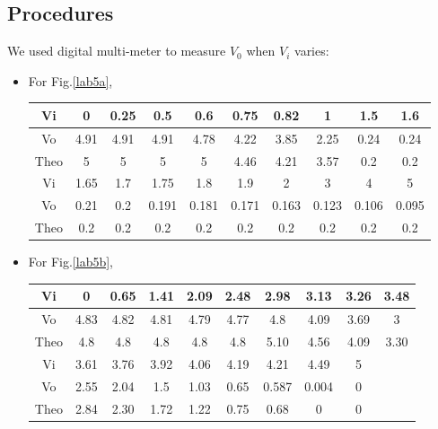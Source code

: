     \subsection{Procedures}
    We used digital multi-meter to measure $V_0$ when $V_i$ varies:\par
    \begin{itemize}
        \item For Fig.\ref{lab5a},\par
            \begin{table}[h]
            \centering
                \begin{tabular}{|c|c|c|c|c|c|c|c|c|c|}
                \hline
                Vi   & 0    & 0.25 & 0.5   & 0.6   & 0.75  & 0.82  & 1     & 1.5   & 1.6   \\ \hline
                Vo   & 4.91 & 4.91 & 4.91  & 4.78  & 4.22  & 3.85  & 2.25  & 0.24  & 0.24  \\ \hline
                Theo & 5    & 5    & 5     & 5     & 4.46  & 4.21  & 3.57  & 0.2   & 0.2   \\ \hline
                Vi   & 1.65 & 1.7  & 1.75  & 1.8   & 1.9   & 2     & 3     & 4     & 5     \\ \hline
                Vo   & 0.21 & 0.2  & 0.191 & 0.181 & 0.171 & 0.163 & 0.123 & 0.106 & 0.095 \\ \hline
                Theo & 0.2  & 0.2  & 0.2   & 0.2   & 0.2   & 0.2   & 0.2     & 0.2     & 0.2     \\ \hline
            \end{tabular}
            \end{table}
            \FloatBarrier
        \item For Fig.\ref{lab5b},\par
            \begin{table}[h]
            \centering
                \begin{tabular}{|c|c|c|c|c|c|c|c|c|c|}
                \hline
                Vi   & 0    & 0.65 & 1.41 & 2.09 & 2.48 & 2.98  & 3.13  & 3.26 & 3.48 \\ \hline
                Vo   & 4.83 & 4.82 & 4.81 & 4.79 & 4.77 & 4.8  & 4.09  & 3.69 & 3    \\ \hline
                Theo & 4.8  & 4.8  & 4.8  & 4.8  & 4.8  & 5.10  & 4.56  & 4.09 & 3.30 \\ \hline
                Vi   & 3.61 & 3.76 & 3.92 & 4.06 & 4.19 & 4.21  & 4.49  & 5    &      \\ \hline
                Vo   & 2.55 & 2.04 & 1.5  & 1.03 & 0.65 & 0.587 & 0.004 & 0    &      \\ \hline
                Theo & 2.84 & 2.30 & 1.72 & 1.22 & 0.75 & 0.68  & 0     & 0    &      \\ \hline
            \end{tabular}
            \end{table}
            \FloatBarrier
    \end{itemize}
    
